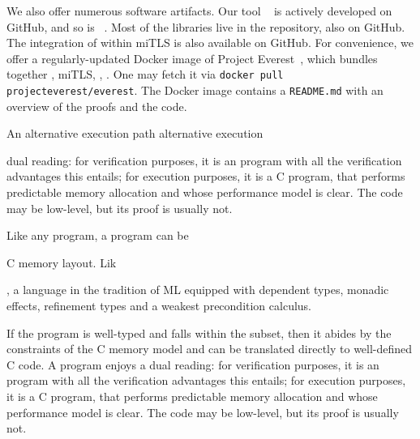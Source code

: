 We also offer numerous software artifacts. Our tool \kremlin~\cite{kremlin} is
actively developed on GitHub, and so is \haclstar~\cite{haclstar-gh}. Most of
the \lowstar libraries live in the \fstar repository, also on GitHub. The
integration of \haclstar within miTLS is also available on GitHub. For
convenience, we offer a regularly-updated Docker image of Project
Everest~\cite{everest-website}, which bundles together
\fstar, miTLS, \haclstar, \kremlin. One may
fetch it via \texttt{docker pull projecteverest/everest}.  The Docker image
contains a \texttt{README.md} with an overview of the proofs and the code.
%



%


An alternative execution path alternative execution

dual reading: for verification
purposes, it is an \fstar program with all the verification advantages
this entails; for execution purposes, it is a C program, that performs
predictable memory allocation and whose performance model is
clear. The \lowstar code may be low-level, but its proof is usually
not.




Like any \fstar program, a \lowstar program can be

C memory layout. Lik


, a language in
the tradition of ML equipped with dependent types, monadic effects,
refinement types and a weakest precondition calculus.

 If the program is well-typed and falls within the
\lowstar subset, then it abides by the constraints of the C memory model and can
be translated directly to well-defined C code.
A \lowstar program enjoys a dual reading: for verification purposes,
it is an \fstar program with all the verification advantages this
entails; for execution purposes, it is a C program, that
performs predictable memory allocation and whose performance model is
clear. The \lowstar code may be low-level, but its proof is usually not.




